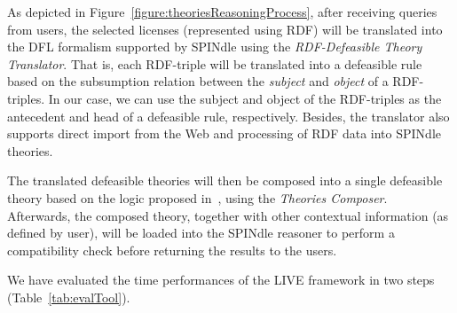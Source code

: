 As depicted in Figure~\ref{figure:theoriesReasoningProcess},
after receiving queries from users,
the selected licenses (represented using RDF) will be translated into the DFL formalism supported by SPINdle using the \textit{RDF-Defeasible Theory Translator}. 
That is,
each RDF-triple will be translated into a defeasible rule based on the subsumption relation between the \textit{subject} and \textit{object} of a RDF-triples.
In our case,
we can use the subject and object of the RDF-triples as the antecedent and head of a defeasible rule, respectively.
Besides, 
the translator also supports direct import from the Web and processing of RDF data into SPINdle theories.
%

The translated defeasible theories will then be composed into a single defeasible theory based on the logic proposed in~\cite{DBLP:conf/semweb/GovernatoriRVG13},
using the \textit{Theories Composer}.
Afterwards,
the composed theory, 
together with other contextual information (as defined by user),
will be loaded into the SPINdle reasoner to perform a compatibility check before returning the results to the users.

We have evaluated the time performances of the LIVE framework in two steps (Table~\ref{tab:evalTool}).

\begin{table}[ht!]
\end{table}


